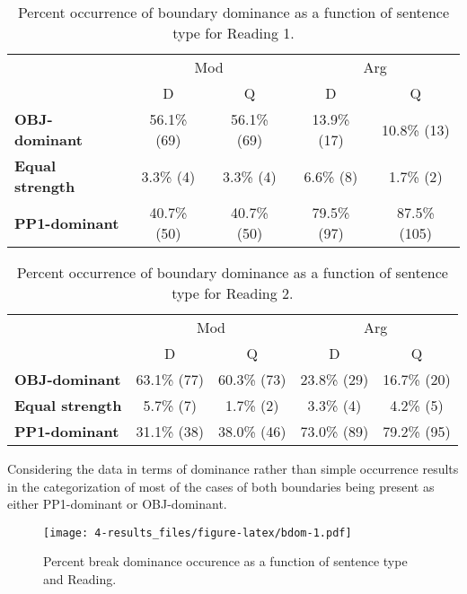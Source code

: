 \documentclass[11pt,oneside]{book}
\begin{document}
\begin{table}[!h]

\caption{\label{tab:r1dombreaks}Percent occurrence of boundary dominance as a function of sentence type for Reading 1.}
\centering
\begin{tabular}{>{\bfseries}lcccc}
\toprule
\multicolumn{1}{c}{ } & \multicolumn{2}{c}{Mod} & \multicolumn{2}{c}{Arg} \\
\cmidrule(l{3pt}r{3pt}){2-3} \cmidrule(l{3pt}r{3pt}){4-5}
  & D & Q & D & Q\\
\midrule
OBJ-dominant & 56.1\% (69) & 56.1\% (69) & 13.9\% (17) & 10.8\% (13)\\
Equal strength & 3.3\% (4) & 3.3\% (4) & 6.6\% (8) & 1.7\% (2)\\
PP1-dominant & 40.7\% (50) & 40.7\% (50) & 79.5\% (97) & 87.5\% (105)\\
\bottomrule
\end{tabular}
\end{table}
\begin{table}[!h]

\caption{\label{tab:r2dombreaks}Percent occurrence of boundary dominance as a function of sentence type for Reading 2.}
\centering
\begin{tabular}{>{\bfseries}lcccc}
\toprule
\multicolumn{1}{c}{ } & \multicolumn{2}{c}{Mod} & \multicolumn{2}{c}{Arg} \\
\cmidrule(l{3pt}r{3pt}){2-3} \cmidrule(l{3pt}r{3pt}){4-5}
  & D & Q & D & Q\\
\midrule
OBJ-dominant & 63.1\% (77) & 60.3\% (73) & 23.8\% (29) & 16.7\% (20)\\
Equal strength & 5.7\% (7) & 1.7\% (2) & 3.3\% (4) & 4.2\% (5)\\
PP1-dominant & 31.1\% (38) & 38.0\% (46) & 73.0\% (89) & 79.2\% (95)\\
\bottomrule
\end{tabular}
\end{table}

Considering the data in terms of dominance rather than simple occurrence results in the categorization of most of the cases of both boundaries being present as either PP1-dominant or OBJ-dominant.

\begin{figure}
\centering
\texttt{[image: 4-results\_files/figure-latex/bdom-1.pdf]}
\caption{\label{fig:bdom}Percent break dominance occurence as a function of sentence type and Reading.}
\end{figure}
\end{document}
